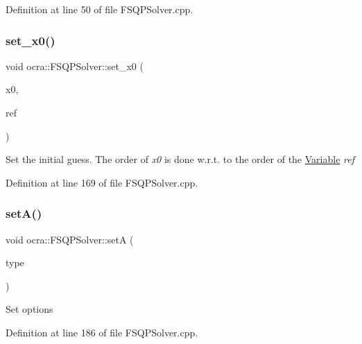 Definition at line 50 of file F\+S\+Q\+P\+Solver.\+cpp.

\hypertarget{classocra_1_1FSQPSolver_a17f6a88734d636c6e1af46d15d4b3e96}{}\label{classocra_1_1FSQPSolver_a17f6a88734d636c6e1af46d15d4b3e96} 
\subsubsection{\texorpdfstring{set\+\_\+x0()}{set\_x0()}}
{\footnotesize\ttfamily void ocra\+::\+F\+S\+Q\+P\+Solver\+::set\+\_\+x0 (\begin{DoxyParamCaption}\item[{const Vector\+Xd \&}]{x0,  }\item[{const \hyperlink{classocra_1_1Variable}{Variable} \&}]{ref }\end{DoxyParamCaption})}

Set the initial guess. The order of {\itshape x0} is done w.\+r.\+t. to the order of the \hyperlink{classocra_1_1Variable}{Variable} {\itshape ref} 

Definition at line 169 of file F\+S\+Q\+P\+Solver.\+cpp.

\hypertarget{classocra_1_1FSQPSolver_a573fda5efbfac9ca2d99b10958160a86}{}\label{classocra_1_1FSQPSolver_a573fda5efbfac9ca2d99b10958160a86} 
\subsubsection{\texorpdfstring{set\+A()}{setA()}}
{\footnotesize\ttfamily void ocra\+::\+F\+S\+Q\+P\+Solver\+::setA (\begin{DoxyParamCaption}\item[{\hyperlink{classocra_1_1FSQPSolver_a1a9c37974603d734acab0d75bc9462ac}{e\+Fsqp\+Problem\+Type}}]{type }\end{DoxyParamCaption})}

Set options 

Definition at line 186 of file F\+S\+Q\+P\+Solver.\+cpp.

\hypertarget{classocra_1_1FSQPSolver_ac3919237e155ce38812e392347abe654}{}\label{classocra_1_1FSQPSolver_ac3919237e155ce38812e392347abe654} 
